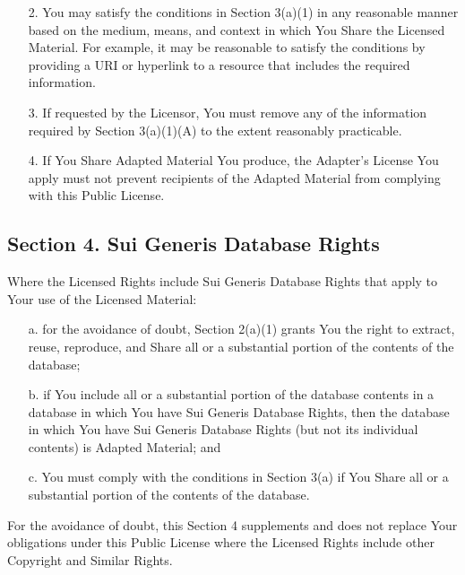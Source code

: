 \begin{scriptsize}
\begin{itemize}
\begin{itemize}
       \item[2.] You may satisfy the conditions in Section 3(a)(1) in any
          reasonable manner based on the medium, means, and context in
          which You Share the Licensed Material. For example, it may be
          reasonable to satisfy the conditions by providing a URI or
          hyperlink to a resource that includes the required
          information.

       \item[3.] If requested by the Licensor, You must remove any of the
          information required by Section 3(a)(1)(A) to the extent
          reasonably practicable.

       \item[4.] If You Share Adapted Material You produce, the Adapter's
          License You apply must not prevent recipients of the Adapted
          Material from complying with this Public License.
	\end{itemize}
\end{itemize}


\subsection*{Section 4. Sui Generis Database Rights}

Where the Licensed Rights include Sui Generis Database Rights that
apply to Your use of the Licensed Material:

\begin{itemize}
  \item[a.] for the avoidance of doubt, Section 2(a)(1) grants You the right
     to extract, reuse, reproduce, and Share all or a substantial
     portion of the contents of the database;

  \item[b.] if You include all or a substantial portion of the database
     contents in a database in which You have Sui Generis Database
     Rights, then the database in which You have Sui Generis Database
     Rights (but not its individual contents) is Adapted Material; and

  \item[c.] You must comply with the conditions in Section 3(a) if You Share
     all or a substantial portion of the contents of the database.
\end{itemize}

For the avoidance of doubt, this Section 4 supplements and does not
replace Your obligations under this Public License where the Licensed
Rights include other Copyright and Similar Rights.



\end{scriptsize}
